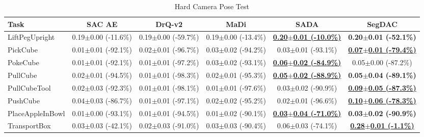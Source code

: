 \begin{table}[htbp]
\centering
\scriptsize
\caption{Hard Camera Pose Test}
\label{tab:appendix_cameraposetest_hard}
\begin{adjustbox}{max width=\textwidth}
\begin{tabular}{l*{5}{c}}
\toprule
\textbf{Task} & \textbf{SAC AE} & \textbf{DrQ-v2} & \textbf{MaDi} & \textbf{SADA} & \textbf{SegDAC} \\
\midrule
LiftPegUpright & 0.19$\pm$0.00 \scriptsize{(-11.6\%)} & 0.19$\pm$0.00 \scriptsize{(-59.7\%)} & 0.19$\pm$0.00 \scriptsize{(-13.4\%)} & \textbf{\underline{0.20$\pm$0.01 \scriptsize{(-10.0\%)}}} & \textbf{0.20$\pm$0.01 \scriptsize{(-52.1\%)}} \\
PickCube & 0.01$\pm$0.01 \scriptsize{(-92.1\%)} & 0.02$\pm$0.01 \scriptsize{(-96.7\%)} & 0.03$\pm$0.02 \scriptsize{(-94.2\%)} & 0.03$\pm$0.01 \scriptsize{(-93.1\%)} & \textbf{\underline{0.07$\pm$0.01 \scriptsize{(-79.4\%)}}} \\
PokeCube & 0.01$\pm$0.01 \scriptsize{(-92.1\%)} & 0.01$\pm$0.01 \scriptsize{(-97.2\%)} & 0.03$\pm$0.02 \scriptsize{(-93.1\%)} & \textbf{\underline{0.06$\pm$0.02 \scriptsize{(-84.9\%)}}} & 0.05$\pm$0.00 \scriptsize{(-87.2\%)} \\
PullCube & 0.02$\pm$0.01 \scriptsize{(-94.5\%)} & 0.01$\pm$0.01 \scriptsize{(-98.3\%)} & 0.02$\pm$0.01 \scriptsize{(-95.3\%)} & \textbf{\underline{0.05$\pm$0.02 \scriptsize{(-88.9\%)}}} & \textbf{0.05$\pm$0.04 \scriptsize{(-89.1\%)}} \\
PullCubeTool & 0.02$\pm$0.03 \scriptsize{(-92.3\%)} & 0.01$\pm$0.01 \scriptsize{(-98.1\%)} & 0.01$\pm$0.01 \scriptsize{(-97.6\%)} & 0.03$\pm$0.02 \scriptsize{(-90.9\%)} & \textbf{\underline{0.09$\pm$0.05 \scriptsize{(-87.3\%)}}} \\
PushCube & 0.04$\pm$0.03 \scriptsize{(-86.7\%)} & 0.01$\pm$0.01 \scriptsize{(-97.1\%)} & 0.02$\pm$0.02 \scriptsize{(-95.2\%)} & 0.02$\pm$0.01 \scriptsize{(-96.6\%)} & \textbf{\underline{0.10$\pm$0.06 \scriptsize{(-78.3\%)}}} \\
PlaceAppleInBowl & 0.01$\pm$0.00 \scriptsize{(-93.1\%)} & 0.01$\pm$0.01 \scriptsize{(-94.5\%)} & 0.01$\pm$0.02 \scriptsize{(-90.1\%)} & \textbf{\underline{0.03$\pm$0.04 \scriptsize{(-71.0\%)}}} & \textbf{0.03$\pm$0.02 \scriptsize{(-90.9\%)}} \\
TransportBox & 0.03$\pm$0.03 \scriptsize{(-42.1\%)} & 0.02$\pm$0.03 \scriptsize{(-91.0\%)} & 0.03$\pm$0.03 \scriptsize{(-90.4\%)} & 0.06$\pm$0.03 \scriptsize{(-74.1\%)} & \textbf{\underline{0.28$\pm$0.01 \scriptsize{(-1.1\%)}}} \\
\bottomrule
\end{tabular}
\end{adjustbox}
\end{table}

